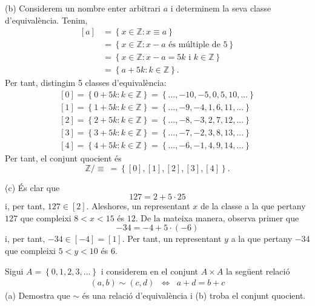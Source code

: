 \begin{solucio}
(b) Considerem un nombre enter arbitrari $a$ i determinem la seva classe
d'equivalència. Tenim,%
\begin{align*}
\left[ a\right] & =\left\{ x\in \mathbb{Z}:x\equiv a\right\} \\
& =\left\{ x\in \mathbb{Z}:x-a\text{ \ és múltiple de }5\right\} \\
& =\left\{ x\in \mathbb{Z}:x-a=5k\text{ \ i \ }k\in \mathbb{Z}\right\} \\
& =\left\{ a+5k:k\in \mathbb{Z}\right\} \text{.}
\end{align*}%
Per tant, distingim 5 classes d'equivalència:%
\begin{equation*}
\begin{array}{c}
\left[ 0\right] =\left\{ 0+5k:k\in \mathbb{Z}\right\} =\left\{
...,-10,-5,0,5,10,...\right\} \\
\left[ 1\right] =\left\{ 1+5k:k\in \mathbb{Z}\right\} =\left\{
...,-9,-4,1,6,11,...\right\} \\
\left[ 2\right] =\left\{ 2+5k:k\in \mathbb{Z}\right\} =\left\{
...,-8,-3,2,7,12,...\right\} \\
\left[ 3\right] =\left\{ 3+5k:k\in \mathbb{Z}\right\} =\left\{
...,-7,-2,3,8,13,...\right\} \\
\left[ 4\right] =\left\{ 4+5k:k\in \mathbb{Z}\right\} =\left\{
...,-6,-1,4,9,14,...\right\}%
\end{array}%
\end{equation*}%
Per tant, el conjunt quocient és%
\begin{equation*}
\mathbb{Z}/\equiv ~=\left\{ \left[ 0\right] ,\left[ 1\right] ,\left[ 2\right]
,\left[ 3\right] ,\left[ 4\right] \right\} \text{.}
\end{equation*}

(c) És clar que%
\begin{equation*}
127=2+5\cdot 25
\end{equation*}%
i, per tant, $127\in \left[ 2\right] $. Aleshores, un representant $x$ de la
classe a la que pertany $127$ que compleixi $8<x<15$ és $12$. De la
mateixa manera, observa primer que%
\begin{equation*}
-34=-4+5\cdot (-6)
\end{equation*}%
i, per tant, $-34\in \left[ -4\right] =\left[ 1\right] $. Per tant, un
representant $y$ a la que pertany $-34$ que compleixi $5<y<10$ és $6$.
\end{solucio}

\begin{exercici}
Sigui $A=\left\{ 0,1,2,3,...\right\} $ i considerem en el conjunt $A\times A$
la següent relació%
\begin{equation*}
\begin{array}{ccc}
(a,b)\sim (c,d) & \Longleftrightarrow & a+d=b+c%
\end{array}%
\end{equation*}%
(a) Demostra que $\sim $ és una relació d'equivalència i (b)
troba el conjunt quocient.
\end{exercici}

